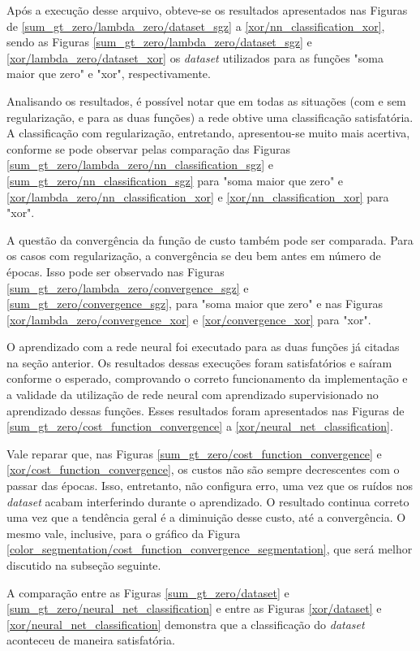 \documentclass[conference]{IEEEtran}
\begin{document}
Após a execução desse arquivo, obteve-se os resultados apresentados nas Figuras de \ref{sum_gt_zero/lambda_zero/dataset_sgz} a \ref{xor/nn_classification_xor}, sendo as Figuras \ref{sum_gt_zero/lambda_zero/dataset_sgz} e \ref{xor/lambda_zero/dataset_xor} os \textit{dataset} utilizados para as funções "soma maior que zero" e "xor", respectivamente.

Analisando os resultados, é possível notar que em todas as situações (com e sem regularização, e para as duas funções) a rede obtive uma classificação satisfatória. A classificação com regularização, entretando, apresentou-se muito mais acertiva, conforme se pode observar pelas comparação das Figuras \ref{sum_gt_zero/lambda_zero/nn_classification_sgz} e \ref{sum_gt_zero/nn_classification_sgz} para "soma maior que zero" e \ref{xor/lambda_zero/nn_classification_xor} e \ref{xor/nn_classification_xor} para "xor". 

A questão da convergência da função de custo também pode ser comparada. Para os casos com regularização, a convergência se deu bem antes em número de épocas. Isso pode ser observado nas Figuras \ref{sum_gt_zero/lambda_zero/convergence_sgz} e \ref{sum_gt_zero/convergence_sgz}, para "soma maior que zero" e nas Figuras \ref{xor/lambda_zero/convergence_xor} e \ref{xor/convergence_xor} para "xor". 

O aprendizado com a rede neural foi executado para as duas funções já citadas na seção anterior. Os resultados dessas execuções foram satisfatórios e saíram conforme o esperado, comprovando o correto funcionamento da implementação e a validade da utilização de rede neural com aprendizado supervisionado no aprendizado dessas funções. Esses resultados foram apresentados nas Figuras de \ref{sum_gt_zero/cost_function_convergence} a \ref{xor/neural_net_classification}.

Vale reparar que, nas Figuras \ref{sum_gt_zero/cost_function_convergence} e \ref{xor/cost_function_convergence}, os custos não são sempre decrescentes com o passar das épocas. Isso, entretanto, não configura erro, uma vez que os ruídos nos \textit{dataset} acabam interferindo durante o aprendizado. O resultado continua correto uma vez que a tendência geral é a diminuição desse custo, até a convergência. O mesmo vale, inclusive, para o gráfico da Figura \ref{color_segmentation/cost_function_convergence_segmentation}, que será melhor discutido na subseção seguinte.

A comparação entre as Figuras \ref{sum_gt_zero/dataset} e \ref{sum_gt_zero/neural_net_classification} e entre as Figuras \ref{xor/dataset} e \ref{xor/neural_net_classification} demonstra que a classificação do \textit{dataset} aconteceu de maneira satisfatória.
\end{document}
